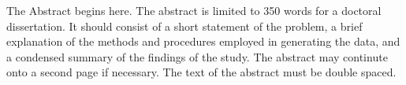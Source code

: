 \begin{dissertationabstract}
    The Abstract begins here. The abstract is limited to 350 words for a
    doctoral dissertation. It should consist of a short statement of the
    problem, a brief explanation of the methods and procedures employed in
    generating the data, and a condensed summary of the findings of the
    study. The abstract may continute onto a second page if necessary. The
    text of the abstract must be double spaced.
\end{dissertationabstract}